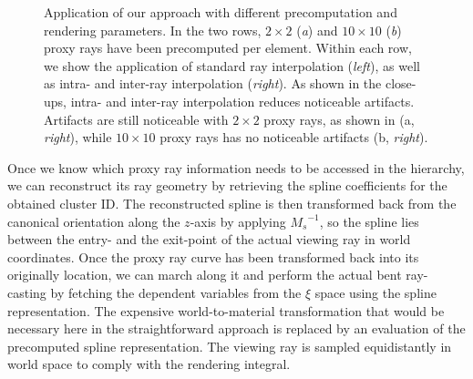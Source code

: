 \documentclass[journal]{vgtc}                %
\begin{document}
\begin{figure}[t]
    \caption{Application of our approach with different precomputation and rendering parameters. In the two rows, $2 \times 2$ ({\it a}) and $10 \times 10$ ({\it b}) proxy rays have been precomputed per element. Within each row, we show the application of standard ray interpolation ({\it left}), as well as intra- and inter-ray interpolation ({\it right}). As shown in the close-ups, intra- and inter-ray interpolation reduces noticeable artifacts. Artifacts are still noticeable with $2 \times 2$ proxy rays, as shown in ({a, \it right}), while $10 \times 10$ proxy rays has no noticeable artifacts ({b, \it right}).}
    \label{fig:rayinterpolation}
\end{figure}

Once we know which proxy ray information needs to be accessed in the hierarchy, we can reconstruct its ray geometry by retrieving the spline coefficients for the obtained cluster ID. The reconstructed spline is then transformed back from the canonical orientation along the $z$-axis by applying ${M_s}^{-1}$, so the spline lies between the entry- and the exit-point of the actual viewing ray in world coordinates. Once the proxy ray curve has been transformed back into its originally location, we can march along it and perform the actual bent ray-casting by fetching the dependent variables from the $\xi$ space using the spline representation. The expensive world-to-material transformation that would be necessary here in the straightforward approach is replaced by an evaluation of the precomputed spline representation. The viewing ray is sampled equidistantly in world space to comply with the rendering integral.   %
\end{document}
